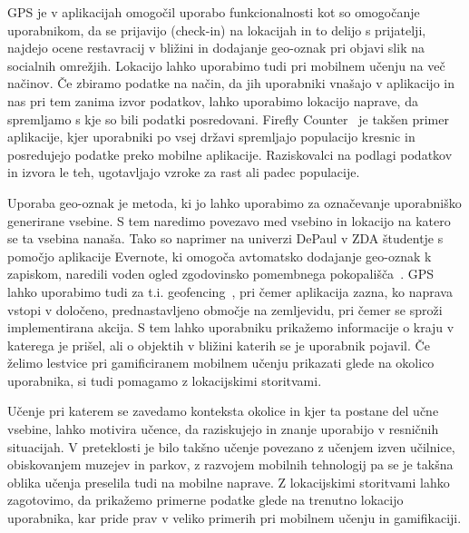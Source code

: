 \documentclass[a4paper, 12pt]{book}
\begin{document}
GPS je v aplikacijah omogočil uporabo funkcionalnosti kot so omogočanje uporabnikom, da se prijavijo (check-in) na lokacijah in to delijo s prijatelji, najdejo ocene restavracij v bližini in dodajanje geo-oznak pri objavi slik na socialnih omrežjih. Lokacijo lahko uporabimo tudi pri mobilnem učenju na več načinov. Če zbiramo podatke na način, da jih uporabniki vnašajo v aplikacijo in nas pri tem zanima izvor podatkov, lahko uporabimo lokacijo naprave, da spremljamo s kje so bili podatki posredovani. Firefly Counter~\cite{firefly} je takšen primer aplikacije, kjer uporabniki po vsej državi spremljajo populacijo kresnic in posredujejo podatke preko mobilne aplikacije. Raziskovalci na podlagi podatkov in izvora le teh, ugotavljajo vzroke za rast ali padec populacije.

Uporaba geo-oznak je metoda, ki jo lahko uporabimo za označevanje uporabniško generirane vsebine. S tem naredimo povezavo med vsebino in lokacijo na katero se ta vsebina nanaša. Tako so naprimer na univerzi DePaul v ZDA študentje s pomočjo aplikacije Evernote, ki omogoča avtomatsko dodajanje geo-oznak k zapiskom, naredili voden ogled zgodovinsko pomembnega pokopališča~\cite{evernote}. GPS lahko uporabimo tudi za t.i. geofencing~\cite{geofence}, pri čemer aplikacija zazna, ko naprava vstopi v določeno, prednastavljeno območje na zemljevidu, pri čemer se sproži implementirana akcija. S tem lahko uporabniku prikažemo informacije o kraju v katerega je prišel, ali o objektih v bližini katerih se je uporabnik pojavil. Če želimo lestvice pri gamificiranem mobilnem učenju prikazati glede na okolico uporabnika, si tudi pomagamo z lokacijskimi storitvami.
 
Učenje pri katerem se zavedamo konteksta okolice in kjer ta postane del učne vsebine, lahko motivira učence, da raziskujejo in znanje uporabijo v resničnih situacijah. V preteklosti je bilo takšno učenje povezano z učenjem izven učilnice, obiskovanjem muzejev in parkov, z razvojem mobilnih tehnologij pa se je takšna oblika učenja preselila tudi na mobilne naprave. Z lokacijskimi storitvami lahko zagotovimo, da prikažemo primerne podatke glede na trenutno lokacijo uporabnika, kar pride prav v veliko primerih pri mobilnem učenju in gamifikaciji.
\end{document}
